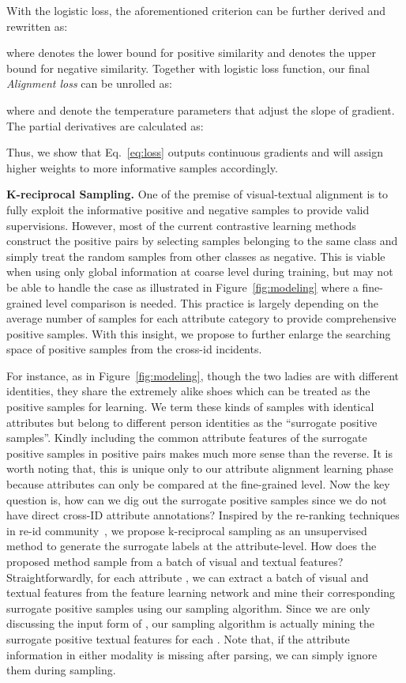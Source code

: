 \documentclass[runningheads]{llncs}
\begin{document}
With the logistic loss, the aforementioned criterion can be further derived and rewritten as:

where  denotes the lower bound for positive similarity and  denotes the upper bound for negative similarity. Together with logistic loss function, our final \emph{Alignment loss} can be unrolled as: 

where  and  denote the temperature parameters that adjust the slope of gradient. The partial derivatives are calculated as:

Thus, we show that Eq.~\ref{eq:loss} outputs continuous gradients and will assign higher weights to more  informative samples accordingly.

\noindent\textbf{K-reciprocal Sampling.}
One of the premise of visual-textual alignment is to fully exploit the informative positive and negative samples  to provide valid supervisions. However, most of the current contrastive learning methods~\cite{wen2016discriminative,zhang2017range} construct the positive pairs by selecting samples belonging to the same class and simply treat the random samples from other classes as negative. This is viable when using only global information at coarse level during training, but may not be able to handle the case as illustrated in Figure~\ref{fig:modeling} where a fine-grained level comparison is needed. This practice is largely depending on the average number of samples for each attribute category to provide comprehensive positive samples. With this insight, we propose to further enlarge the searching space of positive samples from the cross-id incidents.

For instance, as in Figure~\ref{fig:modeling}, though the two ladies are with different identities, they share the extremely alike shoes which can be treated as the positive samples for learning. We term these kinds of samples with identical attributes but belong to different person identities as the ``surrogate positive samples''. Kindly including the common attribute features of the surrogate positive samples in positive pairs makes much more sense than the reverse. It is worth noting that, this is unique only to our attribute alignment learning phase because attributes can only be compared at the fine-grained level. Now the key question is, how can we dig out the surrogate positive samples since we do not have direct cross-ID attribute annotations? Inspired by the re-ranking techniques in re-id community~\cite{garcia2015person,zhong2017re}, we propose k-reciprocal sampling as an unsupervised method to generate the surrogate labels at the attribute-level. How does the proposed method sample from a batch of visual and textual features? Straightforwardly, for each attribute , we can extract a batch of visual and textual features from the feature learning network and mine their corresponding surrogate positive samples using our sampling algorithm. Since we are only discussing the input form of , our sampling algorithm is actually mining the surrogate positive textual features for each . Note that, if the attribute information in either modality is missing after parsing, we can simply ignore them during sampling.
\end{document}
